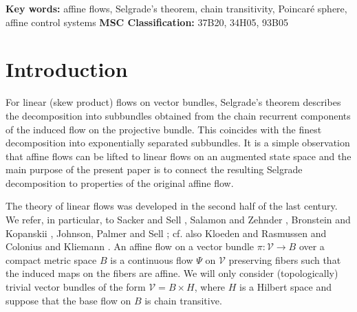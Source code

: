 \begin{abstract}	
Affine flows on vector bundles with chain transitive base flow are lifted to
		linear flows and the decomposition into exponentially separated subbundles
		provided by Selgrade's theorem is determined. The results are illustrated by
		an application to affine control systems with bounded control range.
\end{abstract}	
	
\noindent\textbf{Key words:}	affine flows, Selgrade's
	theorem, chain transitivity, Poincar\'{e} sphere, affine control systems
\newline\noindent\textbf{MSC Classification:}	37B20, 34H05, 93B05

	
	\maketitle
	
	\section{Introduction\label{Section1}}
	
	
	For linear (skew product) flows on vector bundles, Selgrade's theorem
	describes the decomposition into subbundles obtained from the chain recurrent
	components of the induced flow on the projective bundle. This coincides with
	the finest decomposition into exponentially separated subbundles. It is a
	simple observation that affine flows can be lifted to linear flows on an
	augmented state space and the main purpose of the present paper is to connect
	the resulting Selgrade decomposition to properties of the original affine flow.
	
	The theory of linear flows was developed in the second half of the last
	century. We refer, in particular, to Sacker and Sell \cite{SacS}, Salamon and
	Zehnder \cite{SalZ88}, Bronstein and Kopanskii \cite{BroK94}, Johnson, Palmer
	and Sell \cite{JoPS87}; cf. also Kloeden and Rasmussen \cite{KloedeR} and
	Colonius and Kliemann \cite{ColK00, ColK14}. An affine flow on a vector bundle
	$\pi:\mathcal{V}\rightarrow B$ over a compact metric space $B$ is a continuous
	flow $\Psi$ on $\mathcal{V}$ preserving fibers such that the induced maps on
	the fibers are affine. We will only consider (topologically) trivial vector
	bundles of the form $\mathcal{V}=B\times H$, where $H$ is a Hilbert space and
	suppose that the base flow on $B$ is chain transitive.
	

